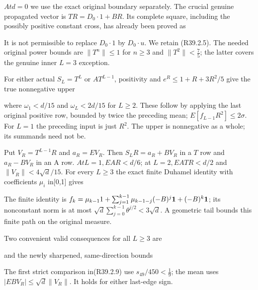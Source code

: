 \(At d=0\) we use the exact original boundary separately. The crucial genuine propagated vector is \(TR=D_0\cdot 1+BR\). Its complete square, including the possibly positive constant cross, has already been proved as


It is not permissible to replace \(D_0\cdot 1\) by \(D_0\cdot u\). We retain (R39.2.5). The needed original power bounds are \(\lVert T^n\rVert \le 1\) for \(n\ge 3\) and \(\lVert T^2\rVert <\frac{7}{5}\); the latter covers the genuine inner \(L=3\) exception.

For either actual \(S_L=T^L\) or \(A T^{L-1}\), positivity and \(e^R\le 1+R+3R^2/5\) give the true nonnegative upper


where \(\omega_1<d/15\) and \(\omega_L<2d/15\) for \(L\ge 2\). These follow by applying the last original positive row, bounded by twice the preceding mean; \(E[f_{L-1}R^2]\le 2\sigma\). For \(L=1\) the preceding input is just \(R^2\). The upper is nonnegative as a whole; its summands need not be.

Put \(V_R=T^{L-1}R\) and \(a_R=EV_R\). Then \(S_LR=a_R+BV_R\) in a \(T\) row and \(a_R-BV_R\) in an A row. \(At L=1,\allowbreak \allowbreak  E AR<d/6\); at \(L=2,\allowbreak \allowbreak  E ATR<d/2\) and \(\lVert V_R\rVert <4\sqrt{d}/15\). For every \(L\ge 3\) the exact finite Duhamel identity with coefficients \(\mu_i\) in[0,1] gives


The finite identity is \(f_k=\mu_{k-1}1+\sum_{j=1}^{k-1}\mu_{k-1-j}(-B)^j\mathbf1+(-B)^k\mathbf1\); its nonconstant norm is at most \(\sqrt{d}\sum_{j=0}^{k-1}\theta^{j/2} <3\sqrt{d}\). A geometric tail bounds this finite path on the original measure.

Two convenient valid consequences for all \(L\ge 3\) are


and the newly sharpened, same-direction bounds


The first strict comparison in(R39.2.9) use \(s_{49}/450<\frac{1}{9}\); the mean uses \(\lvert EBV_R\rvert \le \sqrt{d}\lVert V_R\rVert \). It holds for either last-edge sign.

